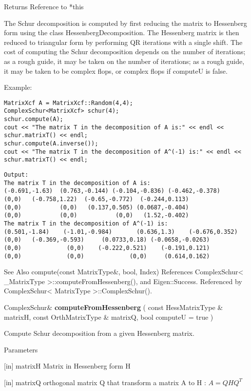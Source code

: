 Returns Reference to *this 

The Schur decomposition is computed by first reducing the matrix to Hessenberg form using the class HessenbergDecomposition. The Hessenberg matrix is then reduced to triangular form by performing QR iterations with a single shift. The cost of computing the Schur decomposition depends on the number of iterations; as a rough guide, it may be taken on the number of iterations; as a rough guide, it may be taken to be  complex flops, or  complex flops if computeU is false.


Example:
\begin{lstlisting}
MatrixXcf A = MatrixXcf::Random(4,4);
ComplexSchur<MatrixXcf> schur(4);
schur.compute(A);
cout << "The matrix T in the decomposition of A is:" << endl << schur.matrixT() << endl;
schur.compute(A.inverse());
cout << "The matrix T in the decomposition of A^(-1) is:" << endl << schur.matrixT() << endl;
\end{lstlisting}

\begin{verbatim}
Output:
The matrix T in the decomposition of A is:
(-0.691,-1.63)  (0.763,-0.144) (-0.104,-0.836) (-0.462,-0.378)
(0,0)   (-0.758,1.22)  (-0.65,-0.772)  (-0.244,0.113)
(0,0)           (0,0)   (0.137,0.505) (0.0687,-0.404)
(0,0)           (0,0)           (0,0)   (1.52,-0.402)
The matrix T in the decomposition of A^(-1) is:
(0.501,-1.84)    (-1.01,-0.984)       (0.636,1.3)    (-0.676,0.352)
(0,0)   (-0.369,-0.593)     (0.0733,0.18) (-0.0658,-0.0263)
(0,0)             (0,0)    (-0.222,0.521)    (-0.191,0.121)
(0,0)             (0,0)             (0,0)     (0.614,0.162)
\end{verbatim}

See Also
compute(const MatrixType\&, bool, Index) 
References ComplexSchur< \_MatrixType >::computeFromHessenberg(), and Eigen::Success.
Referenced by ComplexSchur< MatrixType >::ComplexSchur().

\vspace{0.3cm}
ComplexSchur\& \textbf{computeFromHessenberg}  ( const HessMatrixType \&  matrixH,    const OrthMatrixType \&  matrixQ,   bool  computeU = true  )   

Compute Schur decomposition from a given Hessenberg matrix. 

Parameters

[in] matrixH Matrix in Hessenberg form H  

[in] matrixQ orthogonal matrix Q that transform a matrix A to H : $A = Q H Q^T$  

